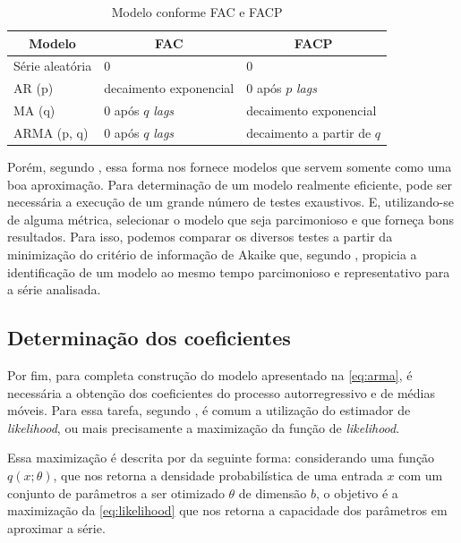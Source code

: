 \documentclass[
    12pt,
    oneside,
    a4paper,
    english,
    brazil
]{abntex2}
\begin{document}
\begin{table}[ht]
    \centering
    \caption{Modelo conforme FAC e FACP}\label{tab:facpacf}
    \begin{tabular}{l l l}
        \multicolumn{1}{c}{Modelo} & \multicolumn{1}{c}{FAC} & \multicolumn{1}{c}{FACP} \\
        \toprule
        Série aleatória  & 0                           & 0                        \\
        AR (p)           & decaimento exponencial      & 0 após $p$ \textit{lags} \\
        MA (q)           & 0 após $q$ \textit{lags}    & decaimento exponencial   \\
        ARMA (p, q)      & 0 após $q$ \textit{lags}    & decaimento a partir de $q$
    \end{tabular}
\end{table}

Porém, segundo  , essa forma nos  fornece modelos  que servem
somente  como uma  boa aproximação.  Para determinação  de um  modelo realmente
eficiente, pode  ser necessária  a  execução  de  um  grande número  de  testes
exaustivos.  E, utilizando-se de alguma  métrica, selecionar o modelo  que  seja
parcimonioso  e que  forneça  bons  resultados. Para  isso, podemos comparar  os
diversos testes a partir da minimização do critério de informação de Akaike que,
segundo  , propicia a identificação  de um  modelo ao  mesmo
tempo parcimonioso e representativo para a série analisada.

\subsection{Determinação dos coeficientes}

Por fim, para completa construção do modelo apresentado na \autoref{eq:arma}, é
necessária a obtenção dos coeficientes  do processo autorregressivo e de médias
móveis. Para  essa tarefa, segundo , é comum a  utilização do
estimador de \textit{likelihood}, ou mais precisamente a maximização da função de
\textit{likelihood}.

Essa  maximização   é  descrita   por     da  seguinte
forma:  considerando  uma função  $q(x;\theta)$, que  nos retorna  a  densidade
probabilística de uma entrada $x$ com um conjunto de parâmetros a ser otimizado
$\theta$ de dimensão $b$, o objetivo é a maximização da \autoref{eq:likelihood}
que nos retorna a capacidade dos parâmetros em aproximar a série.
\end{document}
